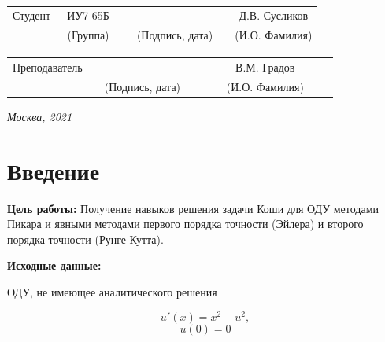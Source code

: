 \documentclass[14pt, a4paper]{extarticle}
\begin{document}
	
	\noindent
	
	\noindent
	\\
	
	\vspace{1.5cm}
	\noindent
	\begin{tabular}{l c c c c c}
		Студент      & ~ИУ7-65Б~               & \hspace{2.5cm} & \hspace{2cm}                 & &  Д.В. 
		Сусликов \\\cline{2-2}\cline{4-4} \cline{6-6} 
		\hspace{3cm} & {\footnotesize(Группа)} &                & {\footnotesize(Подпись, дата)} & & {\footnotesize(И.О. Фамилия)}
	\end{tabular}
	
	\noindent
	\begin{tabular}{l c c c c}
		Преподаватель & \hspace{5cm}   & \hspace{2cm}                 & & ~~~~~~В.М. Градов~~~~~~\\\cline{3-3} \cline{5-5} 
		\hspace{3cm}  &                & {\footnotesize(Подпись, дата)} & & {\footnotesize(И.О. Фамилия)}
	\end{tabular}
	
	\vspace{0.6cm}
	\begin{center}	
		\vfill
		\large \textit {Москва, 2021}
	\end{center}
	
	\thispagestyle {empty}
	\pagebreak
	
	\clearpage
		
	\clearpage
	\section*{Введение}
	\textbf{Цель работы:} Получение навыков решения задачи Коши для ОДУ методами Пикара и
	явными методами первого порядка точности (Эйлера) и второго порядка точности (Рунге-Кутта).\par
	\textbf{Исходные данные:}
	\par ОДУ, не имеющее аналитического решения\par
		$$u'(x) = x^2 + u^2, $$
		$$u(0) = 0 $$
	\par
	
\end{document}
